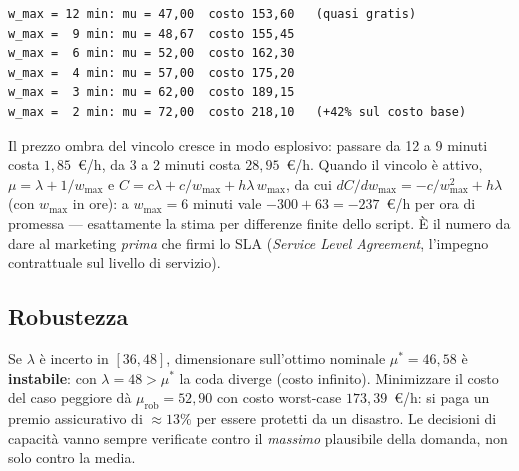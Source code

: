 \begin{lstlisting}[style=output]
w_max = 12 min: mu = 47,00  costo 153,60   (quasi gratis)
w_max =  9 min: mu = 48,67  costo 155,45
w_max =  6 min: mu = 52,00  costo 162,30
w_max =  4 min: mu = 57,00  costo 175,20
w_max =  3 min: mu = 62,00  costo 189,15
w_max =  2 min: mu = 72,00  costo 218,10   (+42% sul costo base)
\end{lstlisting}

\begin{center}
\end{center}

\begin{spiegazione}
Il prezzo ombra del vincolo cresce in modo esplosivo: passare da 12 a 9 minuti costa
$1{,}85$~\euro/h, da 3 a 2 minuti costa $28{,}95$~\euro/h. Quando il vincolo è attivo,
$\mu = \lambda + 1/w_{\max}$ e $C = c\lambda + c/w_{\max} + h\lambda\, w_{\max}$, da cui
$dC/dw_{\max} = -c/w_{\max}^2 + h\lambda$ (con $w_{\max}$ in ore): a $w_{\max} = 6$
minuti vale $-300 + 63 = -237$~\euro/h per ora di promessa --- esattamente la stima
per differenze finite dello script. È il numero da dare al marketing \emph{prima} che
firmi lo SLA (\emph{Service Level Agreement}, l'impegno contrattuale sul livello di
servizio).
\end{spiegazione}

\subsection*{Robustezza}

Se $\lambda$ è incerto in $[36, 48]$, dimensionare sull'ottimo nominale
$\mu^* = 46{,}58$ è \textbf{instabile}: con $\lambda = 48 > \mu^*$ la coda diverge
(costo infinito). Minimizzare il costo del caso peggiore dà $\mu_{\text{rob}} = 52{,}90$
con costo worst-case $173{,}39$~\euro/h: si paga un premio assicurativo di
$\approx 13\%$ per essere protetti da un disastro. Le decisioni di capacità vanno
sempre verificate contro il \emph{massimo} plausibile della domanda, non solo contro
la media.

